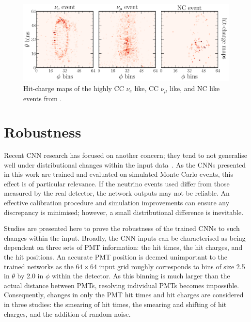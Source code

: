 \begin{figure} %
    \includegraphics[width=\textwidth]{diagrams/7-results/explain_beam_tsne_events.pdf}
    \caption[Hit-charge maps of highly CC $\nu_{e}$ like, CC $\nu_{\mu}$ like, and NC like events]
    {Hit-charge maps of the highly CC $\nu_{e}$ like, CC $\nu_{\mu}$ like, and NC like events from
        .}
    \label{fig:explain_beam_tsne_events}
\end{figure}

\section{Robustness} %
\label{sec:results_robust} %

Recent CNN research has focused on another concern; they tend to not generalise well under
distributional changes within the input data~\cite{djolonga2020}. As the CNNs presented in this
work are trained and evaluated on simulated Monte Carlo events, this effect is of particular
relevance. If the neutrino events used differ from those measured by the real \chipsfive detector,
the network outputs may not be reliable. An effective calibration procedure and simulation
improvements can ensure any discrepancy is minimised; however, a small distributional difference
is inevitable.

Studies are presented here to prove the robustness of the trained CNNs to such changes within the
input. Broadly, the CNN inputs can be characterised as being dependent on three sets of PMT
information: the hit times, the hit charges, and the hit positions. An accurate PMT position is
deemed unimportant to the trained networks as the $64 \times 64$ input grid roughly corresponds to
bins of size \SI{2.5}{} in $\theta$ by \SI{2.0}{} in $\phi$ within the \chipsfive
detector. As this binning is much larger than the actual distance between PMTs, resolving
individual PMTs becomes impossible. Consequently, changes in only the PMT hit times and hit
charges are considered in three studies: the smearing of hit times, the smearing and shifting of
hit charges, and the addition of random noise.

